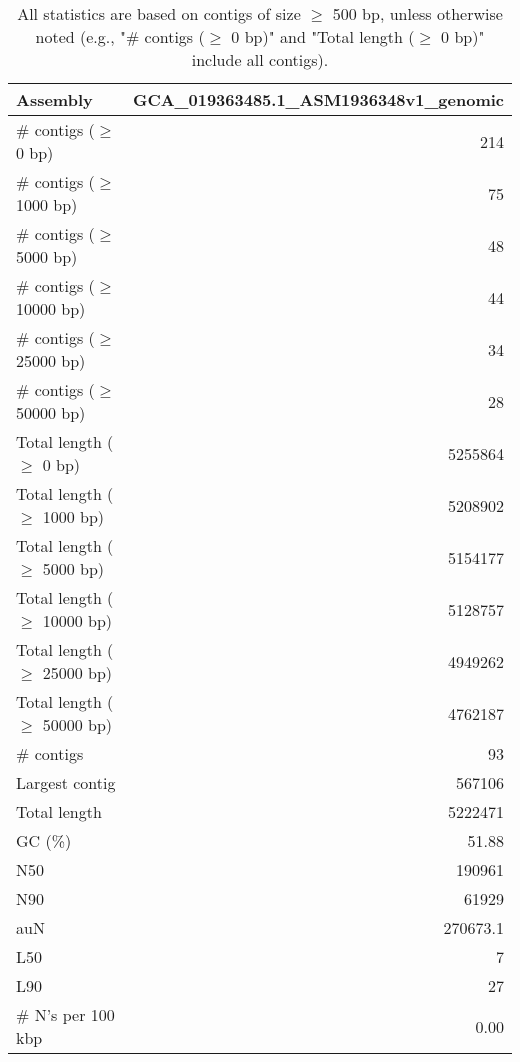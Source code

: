 \documentclass[12pt,a4paper]{article}
\begin{document}
\begin{table}[ht]
\begin{center}
\caption{All statistics are based on contigs of size $\geq$ 500 bp, unless otherwise noted (e.g., "\# contigs ($\geq$ 0 bp)" and "Total length ($\geq$ 0 bp)" include all contigs).}
\begin{tabular}{|l*{1}{|r}|}
\hline
Assembly & GCA\_019363485.1\_ASM1936348v1\_genomic \\ \hline
\# contigs ($\geq$ 0 bp) & 214 \\ \hline
\# contigs ($\geq$ 1000 bp) & 75 \\ \hline
\# contigs ($\geq$ 5000 bp) & 48 \\ \hline
\# contigs ($\geq$ 10000 bp) & 44 \\ \hline
\# contigs ($\geq$ 25000 bp) & 34 \\ \hline
\# contigs ($\geq$ 50000 bp) & 28 \\ \hline
Total length ($\geq$ 0 bp) & 5255864 \\ \hline
Total length ($\geq$ 1000 bp) & 5208902 \\ \hline
Total length ($\geq$ 5000 bp) & 5154177 \\ \hline
Total length ($\geq$ 10000 bp) & 5128757 \\ \hline
Total length ($\geq$ 25000 bp) & 4949262 \\ \hline
Total length ($\geq$ 50000 bp) & 4762187 \\ \hline
\# contigs & 93 \\ \hline
Largest contig & 567106 \\ \hline
Total length & 5222471 \\ \hline
GC (\%) & 51.88 \\ \hline
N50 & 190961 \\ \hline
N90 & 61929 \\ \hline
auN & 270673.1 \\ \hline
L50 & 7 \\ \hline
L90 & 27 \\ \hline
\# N's per 100 kbp & 0.00 \\ \hline
\end{tabular}
\end{center}
\end{table}
\end{document}
